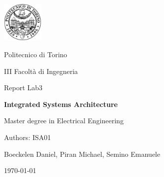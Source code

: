 \documentclass[10pt,  english, makeidx, a4paper, titlepage, oneside]{book}
\begin{document}
\frontmatter
\begin{titlepage}
\vspace{2cm}
\centerline{
\includegraphics[width=2cm]{./logopoli}}  
\centerline{\LARGE Politecnico di Torino}
\bigskip
\centerline{\Large III Facolt\`a di Ingegneria}
\vspace{4cm}
\centerline{\Huge\sf Report Lab3}
\bigskip
\centerline{\Huge\bfseries\sf Integrated Systems Architecture}
\vspace{2cm}
\centerline{\LARGE Master degree in Electrical Engineering}
\vspace{4.4cm}
%
\centerline{\Large Authors: ISA01}
\vspace{2cm}
%
%
\centerline{Boeckelen Daniel, Piran Michael, Semino Emanuele}
%
\vspace{2cm}
\centerline{\today}
\vspace{1cm}
\end{titlepage}

\tableofcontents

% 
\mainmatter
\lstset{language=VHDL}






\end{document}
